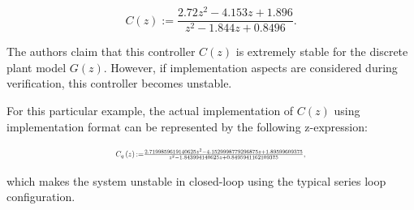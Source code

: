 \documentclass{sig-alternate-05-2015}
\begin{document}
\begin{equation}
\label{Eq:running-example-controller}
C\left(z\right) := \frac{2.72z^2 - 4.153z + 1.896}{z^2 - 1.844z + 0.8496}.
\end{equation}

The authors claim that this controller $C(z)$ is extremely stable for the
discrete plant model $G(z)$.  However, if implementation aspects are
considered during verification, this controller becomes unstable.

For this particular example, the actual implementation of $C(z)$ using
 implementation format can be represented by the following
z-expression:

\begin{equation}
\label{Eq:running-example-controller-quantized}
\resizebox{0.5\textwidth}{!}{
$C_{q}\left(z\right) {:=} \frac{2.7199859619140625z^2 - 4.1529998779296875z + 1.89599609375}{z^2 - 1.843994140625z + 0.8495941162109375},$
}
\end{equation} 

\noindent which makes the system unstable in closed-loop using the typical series loop configuration.


%

%

\end{document}
